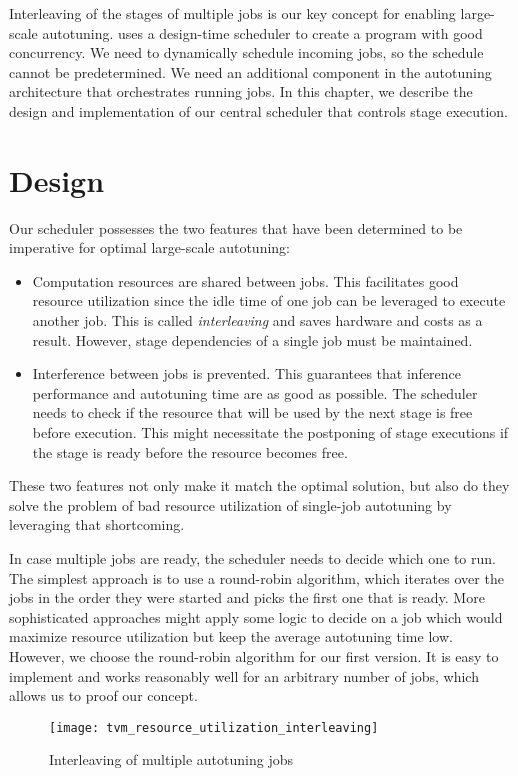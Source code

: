 Interleaving of the stages of multiple jobs is our key concept for enabling large-scale autotuning. \cite{Ma.2005} uses a design-time scheduler to create a program with good concurrency. We need to dynamically schedule incoming jobs, so the schedule cannot be predetermined. We need an additional component in the autotuning architecture that orchestrates running jobs. In this chapter, we describe the design and implementation of our central scheduler that controls stage execution.

\section{Design}
Our scheduler possesses the two features that have been determined to be imperative for optimal large-scale autotuning:
\begin{itemize}
	\item Computation resources are shared between jobs. This facilitates good resource utilization since the idle time of one job can be leveraged to execute another job. This is called \textit{interleaving} and saves hardware and costs as a result. However, stage dependencies of a single job must be maintained.
	\item Interference between jobs is prevented. This guarantees that inference performance and autotuning time are as good as possible. The scheduler needs to check if the resource that will be used by the next stage is free before execution. This might necessitate the postponing of stage executions if the stage is ready before the resource becomes free.
\end{itemize}
These two features not only make it match the optimal solution, but also do they solve the problem of bad resource utilization of single-job autotuning by leveraging that shortcoming.

In case multiple jobs are ready, the scheduler needs to decide which one to run. The simplest approach is to use a round-robin algorithm, which iterates over the jobs in the order they were started and picks the first one that is ready. More sophisticated approaches might apply some logic to decide on a job which would maximize resource utilization but keep the average autotuning time low. However, we choose the round-robin algorithm for our first version. It is easy to implement and works reasonably well for an arbitrary number of jobs, which allows us to proof our concept.

\begin{figure}[h]
	\centering
	\texttt{[image: tvm\_resource\_utilization\_interleaving]}%
	\caption{Interleaving of multiple autotuning jobs}
	\label{fig:interleaving}
\end{figure}

